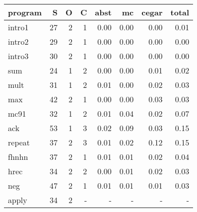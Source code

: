 
\begin{table*}
\begin{center}
\begin{tabular}{|l|r|r|r|r|r|r|r|}
\hline
program & S & O & C & abst & mc & cegar %
& total \\
\hline
intro1&         27&     2&      1 & 0.00 & 0.00 & 0.00 & 0.01 \\
intro2&         29&     2&      1 & 0.00 & 0.00 & 0.00 & 0.00 \\
intro3&         30&     2&      1 & 0.00 & 0.00 & 0.00 & 0.00 \\
sum&            24&     1&      2 & 0.00 & 0.00 & 0.01 & 0.02 \\
mult&           31&     1&      2 & 0.01 & 0.00 & 0.02 & 0.03 \\
max&            42&     2&      1 & 0.00 & 0.00 & 0.03 & 0.03 \\
mc91&           32&     1&      2 & 0.01 & 0.04 & 0.02 & 0.07 \\
ack&            53&     1&      3 & 0.02 & 0.09 & 0.03 & 0.15 \\
repeat&         37&     2&      3 & 0.01 & 0.02 & 0.12 & 0.15\\
fhnhn &         37&     2&      1 & 0.01 & 0.01 & 0.02 & 0.04 \\
hrec &          34&     2&      2 & 0.00 & 0.01 & 0.02 & 0.03 \\
neg&            47&     2&      1 & 0.01 & 0.01 & 0.01 & 0.03 \\
apply&          34&     2&      -&      -&      -&      -&      -\\

\end{tabular}
\end{center}
\end{table*}
